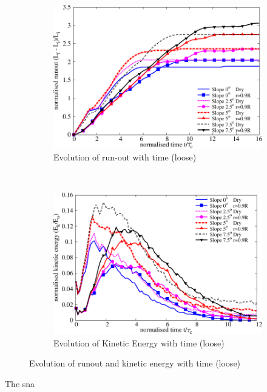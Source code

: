 \begin{figure}
\centering
\begin{subfigure}[b]{0.95\textwidth}
\centering
\includegraphics[width=0.97\columnwidth]{Runout_loose_slope}
\caption{Evolution of run-out with time (loose)}
\label{fig:run_loose}
\end{subfigure} \\
\begin{subfigure}[b]{0.95\textwidth}
\centering
\includegraphics[width=0.97\columnwidth]{KE_loose_slope}
\caption{Evolution of Kinetic Energy with time (loose)}
\label{fig:KE_loose}
\end{subfigure}
\caption{Evolution of runout and kinetic energy with time (loose)}
\label{fig:KE_run_loose}
\end{figure}

The sna

